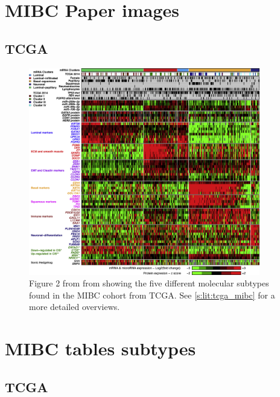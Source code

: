 \newpage

\begin{appendices}

\section{MIBC Paper images}

\subsection{TCGA}

\begin{figure}[!htb]    
    \centering
\includegraphics[width=0.9\textwidth,height=0.9\textheight,keepaspectratio]{Sections/Lit_review/Resources/TCGA_2017_subtypes.jpg}
    \caption{Figure 2 from from \cite{Robertson2017-mg} showing the five different molecular subtypes found in the MIBC cohort from TCGA. See \cref{s:lit:tcga_mibc} for a more detailed overviews.}
    \label{fig:ap:tcga_subtypes}
\end{figure}

\section{MIBC tables subtypes}

\subsection{TCGA}


\end{appendices}
